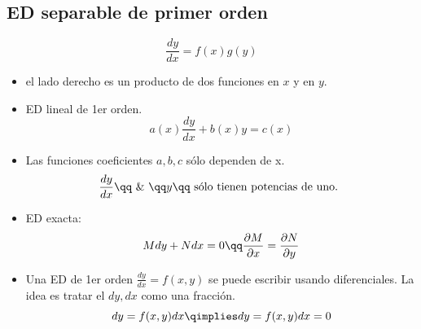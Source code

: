 \subsection{ED separable de primer orden}
\[
  \frac{d y}{d x} = f(x)g(y)
\]
\begin{itemize}
    \item el lado derecho es un producto de dos funciones en $x$ y en $y$.
    \item ED lineal de 1er orden.
        \[
          a(x)\frac{d y}{d x} + b(x)y = c(x)
        \]
    
    \item Las funciones coeficientes $a,b,c$ sólo dependen de x.
        \[
          \frac{d y}{d x} \qq \text{ \& } \qq y \qq \text{ sólo tienen potencias de uno. }
        \]
    
    \item ED exacta:
        \[
          M dy + N dx = 0  \qq \frac{\partial M}{\partial x} = \frac{\partial N}{\partial y} \\ 
        \]
    
    \item Una ED de 1er orden $\displaystyle \frac{d y}{d x} = f(x,y)$ se puede escribir usando diferenciales. La idea es tratar el $dy,dx$ como una fracción.
        \[
          dy=f(x,y)dx \qimplies dy=f(x,y)dx=0
        \]
\end{itemize}

